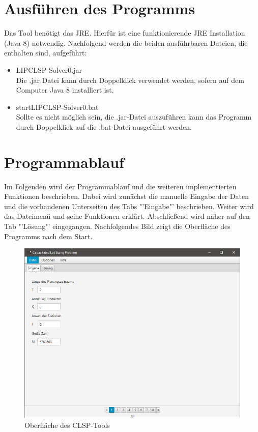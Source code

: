 \documentclass[12pt,a4paper, listof=entryprefix, bibliography=totocnumbered,toc=listofnumbered,lof=listofnumbered]{scrartcl}
\begin{document}
\section{Ausführen des Programms}
\label{ch:ausfuehren}
Das Tool benötigt das \gls{JRE}. Hierfür ist eine funktionierende \gls{JRE} Installation (Java 8) notwendig. Nachfolgend werden die beiden ausführbaren Dateien, die enthalten sind, aufgeführt:
\begin{itemize}
	\item LIP\textunderscore CLSP-Solver\textunderscore 0.jar\\
	Die .jar Datei kann durch Doppelklick verwendet werden, sofern auf dem Computer Java 8 installiert ist.
	\item start\textunderscore LIP\textunderscore CLSP-Solver\textunderscore 0.bat\\
	Sollte es nicht möglich sein, die .jar-Datei auszuführen kann das Programm durch Doppelklick auf die .bat-Datei ausgeführt werden.
\end{itemize}

\pagebreak

\section{Programmablauf}
\label{ch:programmablauf}
Im Folgenden wird der Programmablauf und die weiteren implementierten Funktionen beschrieben. Dabei wird zunächst die manuelle Eingabe der Daten und die vorhandenen Unterseiten des Tabs "'Eingabe"' beschrieben. Weiter wird das Dateimenü und seine Funktionen erklärt. Abschließend wird näher auf den Tab "'Lösung"' eingegangen. Nachfolgendes Bild zeigt die Oberfläche des Programms nach dem Start.

\begin{figure}[H]
	\centering
	\includegraphics[width=1.0\linewidth]{images/CLSP_GUI.png} 
	\caption{Oberfläche des CLSP-Tools}
	\label{fig:clspgui}
\end{figure}
\end{document}
